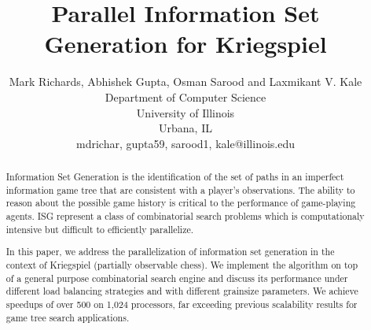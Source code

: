 \documentclass[times, 10pt,twocolumn]{article}
\begin{document}
\title{Parallel Information Set Generation for Kriegspiel 
       }

\author{Mark Richards, Abhishek Gupta, Osman Sarood and Laxmikant V. Kale\\
Department of Computer Science\\ 
University of Illinois\\ 
Urbana, IL\\ {mdrichar, gupta59, sarood1, kale}@illinois.edu\\
}

\maketitle
\thispagestyle{empty}



\begin{abstract}
Information Set Generation is the identification of the set of paths in an
imperfect information game tree that are consistent with a player's
observations.  The ability to reason about the possible game history is
critical to the performance of game-playing agents.  ISG represent a class of
combinatorial search problems which is computationaly intensive but difficult
to efficiently parallelize.

In this paper, we address the parallelization of information set generation in
the context of Kriegspiel (partially observable chess).  We implement the
algorithm on top of a general purpose combinatorial search engine and discuss
its performance under different load balancing strategies and with different
grainsize parameters.  We achieve speedups of over 500 on 1,024 processors, far
exceeding previous scalability results for game tree search applications.
\end{abstract}
\end{document}
